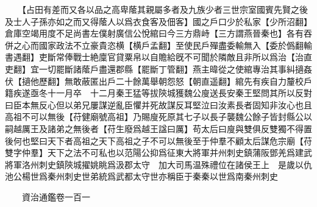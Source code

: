 　　【占田有差而又各以品之高卑䕃其親屬多者及九族少者三世宗室國賓先賢之後及士人子孫亦如之而又得䕃人以爲衣食客及佃客】國之戶口少於私家【少所沼翻】倉庫空竭用度不足尚書左僕射廣信公悅綰曰今三方鼎峙【三方謂燕晉秦也】各有吞併之心而國家政法不立豪貴恣横【横戶孟翻】至使民戶殫盡委輸無入【委於僞翻輸書遇翻】吏斷常俸戰士絶廩官貸粟帛以自贍給旣不可聞於隣敵且非所以爲治【治直吏翻】宜一切罷斷諸䕃戶盡還郡縣【罷斷丁管翻】燕主暐從之使綰專治其事糾擿姦伏【擿他歷翻】無敢蔽匿出戶二十餘萬舉朝怨怒【朝直遥翻】綰先有疾自力釐校戶籍疾遂亟冬十一月卒　十二月秦王猛等拔陝城獲魏公廋送長安秦王堅問其所以反對曰臣本無反心但以弟兄屢謀逆亂臣懼并死故謀反耳堅泣曰汝素長者固知非汝心也且高祖不可以無後【苻健廟號高祖】乃賜廋死原其七子以長子襲魏公餘子皆封縣公以嗣越厲王及諸弟之無後者【苻生廢爲越王諡曰厲】苟太后曰廋與雙俱反雙獨不得置後何也堅曰天下者高祖之天下高祖之子不可以無後至于仲羣不顧太后謀危宗廟【苻雙字仲羣】天下之法不可私也以范陽公抑爲征東大將軍并州刺史鎮蒲阪鄧羌爲建武將軍洛州刺史鎮陝城擢姚眺爲汲郡太守　加大司馬温殊禮位在諸侯王上　是歲以仇池公楊世爲秦州刺史世弟統爲武都太守世亦稱臣于秦秦以世爲南秦州刺史

　　資治通鑑卷一百一  
    


 


 



 

 
  







 


　　
　　
　
　
　


　　

　















	
	









































